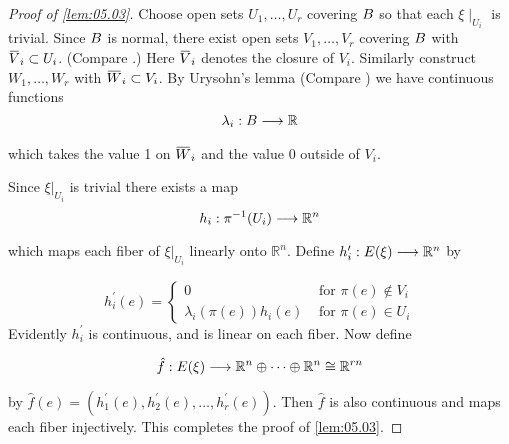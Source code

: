 \documentclass[../main]{subfiles}
\begin{document}
\begin{proof}[Proof of \ref{lem:05.03}]
Choose open sets $U_{1}, \dots, U_{r}$ covering $B $ so that each $\xi \mid _{U_{i}}$ is trivial. Since $B $ is normal, there exist open sets $V_{1}, \dots, V_{r}$ covering $B $ with $\xoverline{V}_{i} \subset U_{i}$. (Compare \cite[p. 171]{kelley1955}.) Here $\xoverline{V}_{i}$ denotes the closure of $V_{i} .$ Similarly construct $W_{1}, \dots, W_{r}$ with $\xoverline{W}_{i} \subset V_{i} $. By Urysohn's lemma (Compare \cite[\S33]{munkres2000topology}) we have continuous functions
\[\map{\lambda_{i}}{\B }{\mathbb{R}}
\]
which takes the value 1 on $\xoverline{W}_{i}$ and the value 0 outside of $V_{i}$.

Since $\xi|_{ U_{i}}$ is trivial there exists a map
\[\map{h_{i}}{\pi^{-1} (U_{i})}{\mathbb{R}^{n}}
\]
which maps each fiber of $\xi| _{U_{i}}$ linearly onto $\mathbb{R}^{n}$. Define $\map{h_{i}^{\prime}}{\total(\xi)}{\mathbb{R}^{n}}$ by

\[
h_{i}^{\prime}(e)=\begin{cases}
	0 & \text { for } \pi(e) \notin V_{i} \\
	\lambda_{i}(\pi(e)) h_{i}(e) & \text { for } \pi(e) \in U_{i}
\end{cases}
\]
Evidently $h_{i}^{\prime}$ is continuous, and is linear on each fiber. Now define

\[\map{\hat{f}}{\total(\xi)}{\mathbb{R}^{n} \oplus \dots \oplus \mathbb{R}^{n} \cong \mathbb{R}^{rn}}
\]
by $\hat{f}(e)=(h_{1}^{\prime}(e), h_{2}^{\prime}(e), \dots, h_{r}^{\prime}(e))$. Then $\hat{f}$ is also continuous and maps each fiber injectively. This completes the proof of \ref{lem:05.03}.	
\end{proof}
\end{document}
